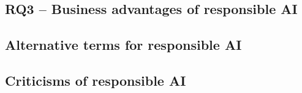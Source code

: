 \subsection{RQ3 -- Business advantages of responsible AI}
\label{sec:results-rq3:advantages}



\subsection{Alternative terms for responsible AI}
\label{sec:results-alernative-terms}

\subsection{Criticisms of responsible AI}
\label{sec:results-criticism}
